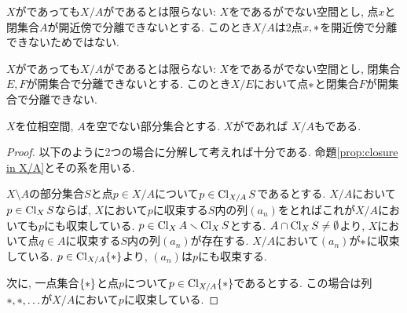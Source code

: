 \documentclass[uplatex, dvipdfmx, a4paper, 12pt, class=jsbook, crop=false]{standalone}
\begin{document}
\begin{remark}
	$X$がであっても$X/A$がであるとは限らない:
	$X$をであるがでない空間とし, 点$x$と閉集合$A$が開近傍で分離できないとする.
	このとき$X/A$は2点$x, \ast$を開近傍で分離できないためではない.
\end{remark}

\begin{remark}
	$X$がであっても$X/A$がであるとは限らない:
	$X$をであるがでない空間とし, 閉集合$E, F$が開集合で分離できないとする.
	このとき$X/E$において点$\ast$と閉集合$F$が開集合で分離できない.
\end{remark}

\begin{proposition}
	$X$を位相空間, $A$を空でない部分集合とする.
	$X$が\Frechet であれば $X/A$も\Frechet である.
\end{proposition}

\begin{proof}
	以下のように2つの場合に分解して考えれば十分である.
	命題\ref{prop:closure in X/A}とその系を用いる.

	$X \setminus A$の部分集合$S$と点$p \in X/A$について$p \in \mathop{\mathrm{Cl}}\nolimits_{X/A} S$であるとする.
	$X/A$において$p \in \mathop{\mathrm{Cl}}\nolimits_X S$ならば, $X$において$p$に収束する$S$内の列$(a_n)$をとればこれが$X/A$においても$p$にも収束している.
	$p \in \mathop{\mathrm{Cl}}\nolimits_X A \smallsetminus \mathop{\mathrm{Cl}}\nolimits_X S$とする.
	$A \cap \mathop{\mathrm{Cl}}\nolimits_X S \neq \emptyset$より, $X$において点$q \in A$に収束する$S$内の列$(a_n)$が存在する.
	$X/A$において$(a_n)$が$\ast$に収束している.
	$p \in \mathop{\mathrm{Cl}}\nolimits_{X/A} \{\ast\}$より, $(a_n)$は$p$にも収束する.

	次に, 一点集合$\{\ast\}$と点$p$について$p \in \mathop{\mathrm{Cl}}\nolimits_{X/A} \{\ast\}$であるとする.
	この場合は列$\ast, \ast, \ldots$が$X/A$において$p$に収束している.
\end{proof}
\end{document}
